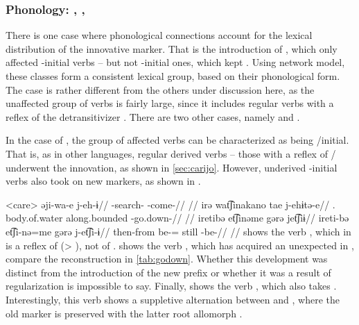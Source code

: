 \subsubsection{Phonology: \akuriyo, \carijo, \yukpa}
\label{sec:phonology}
There is one case where phonological connections account for the lexical distribution of the innovative marker.
That is the introduction of \akuriyo {}, which only affected -initial verbs -- but not -initial ones, which kept  .
Using  network model, these classes form a consistent lexical group, based on their phonological form.
The \akuriyo case is rather different from the others under discussion here, as the unaffected group of verbs is fairly large, since it includes regular  verbs with a reflex of the detransitivizer .
There are two other cases, namely \carijo {}  and \yukpa {} .

In the case of \carijo, the group of affected verbs can be characterized as being /initial.
That is, as in other languages, regular derived  verbs -- those with a reflex of / underwent the innovation, as shown in \cref{sec:carijo}.
However, underived -initial  verbs also took on new markers, as shown in .

\pex<care>\carijo
{}
\begingl
\gla əji-wa-e j-eh-ɨ//
\glb {}-search- -come-//
\glft {} \parencite[][102]{guerrero2019carijo}//
\endgl
{}
\begingl
\gla irə wat͡ʃinakano tae j-ehɨtə-e//
\glb {}. body.of.water along.bounded -go.down-//
\glft {} //
\endgl
{}
\begingl
\glpreamble iretibə et͡ʃinəme gərə jet͡ʃiɨ//
\gla ireti-bə et͡ʃi-nə=me gərə j-et͡ʃi-ɨ//
\glb then-from be-= still -be-//
\glft {} \parencite[][177]{robayo1989rame}//
\endgl
\xe
%
 shows the verb , which in \carijo is a reflex of  (> ), not of .
 shows the verb , which has acquired an unexpected  in \carijo, compare the reconstruction in \cref{tab:godown}.
Whether this development was distinct from the introduction of the new prefix  or whether it was a result of regularization is impossible to say.
Finally,  shows the verb  , which also takes .
Interestingly, this verb shows a suppletive alternation between  and , where the old marker  is preserved with the latter root allomorph .

